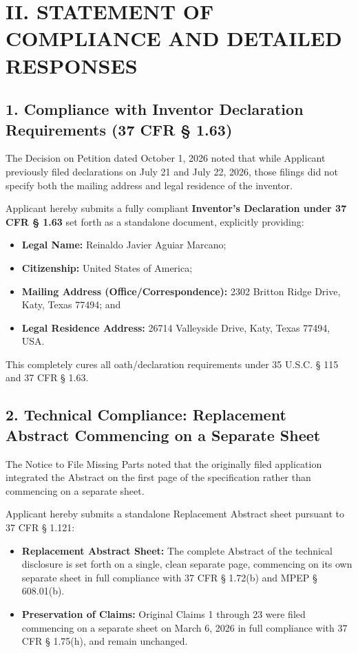 \documentclass[11pt,letterpaper]{article}
\begin{document}
\newpage

\section*{II. STATEMENT OF COMPLIANCE AND DETAILED RESPONSES}

\subsection*{1. Compliance with Inventor Declaration Requirements (37 CFR \S{} 1.63)}

The Decision on Petition dated October 1, 2026 noted that while Applicant previously filed declarations on July 21 and July 22, 2026, those filings did not specify both the mailing address and legal residence of the inventor.

Applicant hereby submits a fully compliant \textbf{Inventor's Declaration under 37 CFR \S{} 1.63} set forth as a standalone document, explicitly providing:
\begin{itemize}[leftmargin=2em, itemsep=2pt, parsep=0pt]
    \item \textbf{Legal Name:} Reinaldo Javier Aguiar Marcano;
    \item \textbf{Citizenship:} United States of America;
    \item \textbf{Mailing Address (Office/Correspondence):} 2302 Britton Ridge Drive, Katy, Texas 77494; and
    \item \textbf{Legal Residence Address:} 26714 Valleyside Drive, Katy, Texas 77494, USA.
\end{itemize}

This completely cures all oath/declaration requirements under 35 U.S.C. \S{} 115 and 37 CFR \S{} 1.63.

\subsection*{2. Technical Compliance: Replacement Abstract Commencing on a Separate Sheet}

The Notice to File Missing Parts noted that the originally filed application integrated the Abstract on the first page of the specification rather than commencing on a separate sheet.

Applicant hereby submits a standalone Replacement Abstract sheet pursuant to 37 CFR \S{} 1.121:
\begin{itemize}[leftmargin=2em, itemsep=2pt, parsep=0pt]
    \item \textbf{Replacement Abstract Sheet:} The complete Abstract of the technical disclosure is set forth on a single, clean separate page, commencing on its own separate sheet in full compliance with 37 CFR \S{} 1.72(b) and MPEP \S{} 608.01(b).
    \item \textbf{Preservation of Claims:} Original Claims 1 through 23 were filed commencing on a separate sheet on March 6, 2026 in full compliance with 37 CFR \S{} 1.75(h), and remain unchanged.
\end{itemize}
\end{document}
